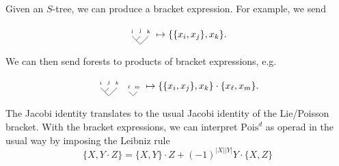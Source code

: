 \documentclass{shortart}
\theoremstyle{definition}
\newcommand\Pois{\mathrm{Pois}}
\begin{document}
Given an $S$-tree, we can produce a bracket expression. For example, we send
\begin{useimager}
  \[
    \begin{tikzpicture}[scale=0.3, baseline={([yshift=-.5ex]current bounding box.center)}]
      \draw (0, 0) -- (-1, 1) node [above=-0.05] {\tiny i};
      \draw (-0.5, 0.5) -- (0, 1) node [above=-0.05] {\tiny j};
      \draw (0, 0) -- (1, 1) node [above=-0.05] {\tiny k};
    \end{tikzpicture}
    \mapsto \{\{x_i, x_j\}, x_k\}.
  \]
\end{useimager}
We can then send forests to products of bracket expressions, e.g.
\begin{useimager}
  \[
    \begin{tikzpicture}[scale=0.3, baseline={([yshift=-.5ex]current bounding box.center)}]
      \draw (0, 0) -- (-1, 1) node [above=-0.05] {\tiny $i$};
      \draw (-0.5, 0.5) -- (0, 1) node [above=-0.05] {\tiny $j$};
      \draw (0, 0) -- (1, 1) node [above=-0.05] {\tiny $k$};
      \begin{scope}[shift={(3, 0)}]

        \draw (0, 0) -- (-0.5, 0.5) node [above=-0.05] {\tiny $\ell$};
        \draw (0, 0) -- (0.5, 0.5) node [above=-0.05] {\tiny $m$};
      \end{scope}
    \end{tikzpicture}
    \mapsto \{\{x_i, x_j\}, x_k\} \cdot \{x_\ell, x_m\}.
  \]
\end{useimager}
The Jacobi identity translates to the usual Jacobi identity of the Lie/Poisson bracket. With the bracket expressions, we can interpret $\Pois^d$ as operad in the usual way by imposing the Leibniz rule
\[
  \{X, Y \cdot Z\} = \{X, Y\} \cdot Z + (-1)^{|X| |Y|} Y \cdot \{X, Z\}
\]
\end{document}
